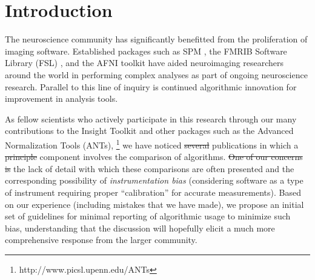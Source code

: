 \documentclass[final,5p,times,twocolumn]{elsarticle}
\newcommand{\trEdit}[1]{{\color{blue}{#1}}}
\newcommand{\trDelete}[1]{{\color{blue}\sout{#1}}}
\begin{document}








\section{Introduction}
The neuroscience community has significantly benefitted from the proliferation
of imaging\trEdit{-related} software.  Established packages such as SPM \cite{Ashburner2012},
the FMRIB Software Library (FSL) \cite{Jenkinson2012}, and
the AFNI toolkit \cite{cox2012} have aided neuroimaging researchers 
around the world in performing complex analyses as part of 
ongoing neuroscience research.  Parallel to this line of
inquiry is continued algorithmic innovation for improvement
in analysis tools.  

As fellow scientists who actively participate in this 
research through our many contributions to the Insight
Toolkit \trEdit{[REF]} and other packages such as the Advanced Normalization Tools (ANTs),%
\footnote{
http://www.picsl.upenn.edu/ANTs
} 
we have noticed \trDelete{several}\trEdit{an increasing number of} publications in which a \trDelete{principle}\trEdit{principal}
component involves the comparison of algorithms\trEdit{, which in priciple is
  a good thing}.  \trDelete{One of our
concerns is}\trEdit{We are concerned, however, by} the lack of detail with which these comparisons are
often presented and the corresponding possibility of {\it instrumentation
bias} \cite{sackett1979} (considering software  as a type of 
instrument requiring proper ``calibration'' for accurate measurements).  
Based on our experience (including mistakes that we \trEdit{ourselves} have made), 
we propose an initial set of guidelines for minimal
reporting of algorithmic usage to minimize such bias, understanding that 
the discussion will hopefully 
elicit a much more comprehensive response from the larger community.
\end{document}

